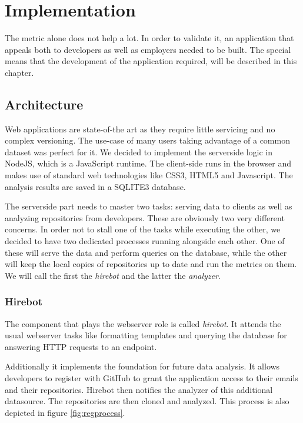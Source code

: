 \chapter{Implementation}\label{ch:implementation}
The metric alone does not help a lot. In order to validate it,
an application that appeals both to developers as well as employers
needed to be built. The special means that the development
of the application required, will be described in this chapter.

\section{Architecture}
Web applications are state-of-the art as they require little servicing
and no complex versioning. The use-case of many users taking
advantage of a common dataset was perfect for it.
We decided to implement the serverside logic in NodeJS, which is a
JavaScript runtime. The client-side runs in the browser and makes
use of standard web technologies like CSS3, HTML5 and Javascript.
The analysis results are saved in a SQLITE3 database.
\newline

The serverside part needs to master two tasks: serving data to clients
as well as analyzing repositories from developers.
These are obviously two very different concerns.
In order not to stall one of the tasks while executing the other,
we decided to have two dedicated processes running alongside each other.
One of these will serve the data and perform queries on the database,
while the other will keep the local copies of repositories up to date and run
the metrics on them. We will call the first the \textit{hirebot} and the
latter the \textit{analyzer}.

\subsection{Hirebot}
The component that plays the webserver role is called \textit{hirebot}.
It attends the usual webserver tasks like formatting templates and querying
the database for answering HTTP requests to an endpoint.
\newline

Additionally it implements the foundation for future data analysis.
It allows developers to register with GitHub to grant the application
access to their emails and their repositories. Hirebot then notifies
the analyzer of this additional datasource. The repositories are then cloned
and analyzed. This process is also depicted in figure \ref{fig:regprocess}.

